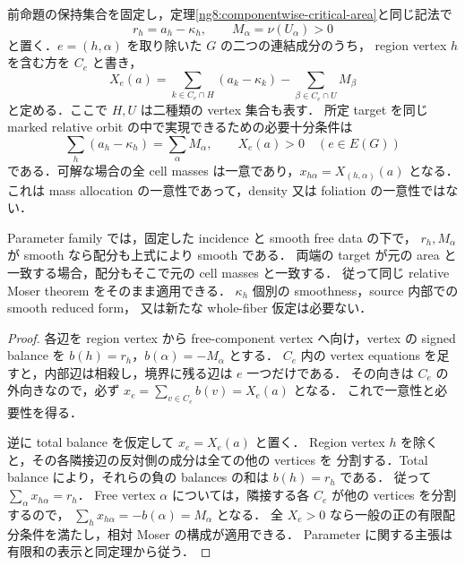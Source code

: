 \begin{corollary}
\label{ng8:tree-edge-area-test}
前命題の保持集合を固定し，定理\ref{ng8:componentwise-critical-area}と同じ記法で
\[
 r_h=a_h-\kappa_h,\qquad M_\alpha=\nu(U_\alpha)>0
\]
と置く．$e=(h,\alpha)$ を取り除いた $G$ の二つの連結成分のうち，
region vertex $h$ を含む方を $C_e$ と書き，
\begin{equation}\label{ng8:eq:tree-edge-flow}
 X_e(a)=
 \sum_{k\in C_e\cap H}(a_k-\kappa_k)
 -\sum_{\beta\in C_e\cap U}M_\beta
\end{equation}
と定める．ここで $H,U$ は二種類の vertex 集合も表す．
所定 target を同じ marked relative orbit の中で実現できるための必要十分条件は
\begin{equation}\label{ng8:eq:tree-edge-inequalities}
 \sum_h(a_h-\kappa_h)=\sum_\alpha M_\alpha,
 \qquad X_e(a)>0\quad(e\in E(G))
\end{equation}
である．可解な場合の全 cell masses は一意であり，$x_{h\alpha}=X_{(h,\alpha)}(a)$
となる．これは mass allocation の一意性であって，density 又は foliation の一意性ではない．

Parameter family では，固定した incidence と smooth free data の下で，
$r_h,M_\alpha$ が smooth なら配分も上式により smooth である．
両端の target が元の area と一致する場合，配分もそこで元の cell masses と一致する．
従って同じ relative Moser theorem をそのまま適用できる．
$\kappa_h$ 個別の smoothness，source 内部での smooth reduced form，
又は新たな whole-fiber 仮定は必要ない．
\end{corollary}

\begin{proof}
各辺を region vertex から free-component vertex へ向け，vertex の signed balance を
$b(h)=r_h$，$b(\alpha)=-M_\alpha$ とする．
$C_e$ 内の vertex equations を足すと，内部辺は相殺し，境界に残る辺は $e$ 一つだけである．
その向きは $C_e$ の外向きなので，必ず $x_e=\sum_{v\in C_e}b(v)=X_e(a)$ となる．
これで一意性と必要性を得る．

逆に total balance を仮定して $x_e=X_e(a)$ と置く．
Region vertex $h$ を除くと，その各隣接辺の反対側の成分は全ての他の vertices を
分割する．Total balance により，それらの負の balances の和は $b(h)=r_h$ である．
従って $\sum_\alpha x_{h\alpha}=r_h$．
Free vertex $\alpha$ については，隣接する各 $C_e$ が他の vertices を分割するので，
$\sum_hx_{h\alpha}=-b(\alpha)=M_\alpha$ となる．
全 $X_e>0$ なら一般の正の有限配分条件を満たし，相対 Moser の構成が適用できる．
Parameter に関する主張は有限和の表示と同定理から従う．
\end{proof}

